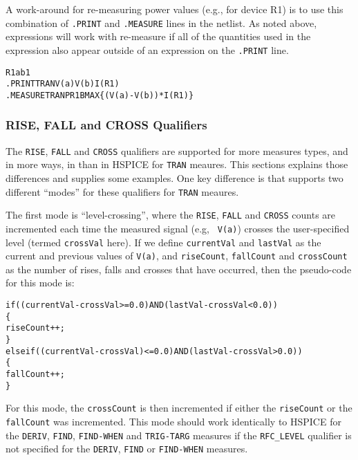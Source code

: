 A work-around for re-measuring power values (e.g., for device R1) is to use this combination 
of {\tt .PRINT} and {\tt .MEASURE} lines in the netlist.  As noted above, expressions will 
work with re-measure if all of the quantities used in the expression also appear outside of 
an expression on the {\tt .PRINT} line.
\begin{alltt}
R1 a b 1
.PRINT TRAN V(a) V(b) I(R1)
.MEASURE TRAN PR1B MAX \{(V(a)-V(b))*I(R1)\}
\end{alltt}

\subsubsection{RISE, FALL and CROSS Qualifiers}
The \texttt{RISE}, \texttt{FALL} and \texttt{CROSS} qualifiers are supported for more 
measures types, and in more ways, in \Xyce{} than in HSPICE for \texttt{TRAN} meaures.  This 
sections explains those differences and supplies some examples.  One key difference is that 
\Xyce{} supports two different ``modes'' for these qualifiers for  \texttt{TRAN} meaures.  

The first mode is ``level-crossing'', where the \texttt{RISE}, \texttt{FALL} 
and \texttt{CROSS} counts are incremented each time the measured signal (e.g, 
\texttt{ V(a)}) crosses the user-specified level (termed \texttt{crossVal} here).  
If we define \texttt{currentVal} and \texttt{lastVal} as the current and previous 
values of \texttt{V(a)}, and \texttt{riseCount}, \texttt{fallCount} and 
\texttt{crossCount} as the number of rises, falls and crosses that have occurred,
then the pseudo-code for this mode is:
\begin{alltt}
if ( (currentVal-crossVal >= 0.0) AND (lastVal-crossVal < 0.0) )
\{
  riseCount++;
\}
else if( (currentVal-crossVal) <= 0.0) AND (lastVal-crossVal > 0.0) )
\{   
  fallCount++;
\}
\end{alltt}
For this mode, the \texttt{crossCount} is then incremented if either the 
\texttt{riseCount}  or the \texttt{fallCount} was incremented.  This mode
should work identically to HSPICE for the \texttt{DERIV}, \texttt{FIND}, 
\texttt{FIND-WHEN} and \texttt{TRIG-TARG} measures if the \texttt{RFC\_LEVEL} 
qualifier is not specified for the \texttt{DERIV}, \texttt{FIND}
or \texttt{FIND-WHEN} measures.

